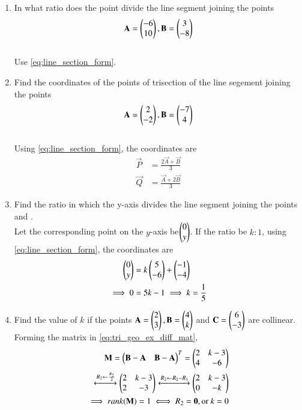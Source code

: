 \begin{enumerate}[label=\arabic*.,ref=\thesubsection.\theenumi]
\item In what ratio does the point  divide the line segment joining the points 
%
\begin{align}
\mathbf{A} = \begin{pmatrix}-6\\10\end{pmatrix},
\mathbf{B} = \begin{pmatrix}3\\-8\end{pmatrix}
\end{align}
%
\\
\solution Use \eqref{eq:line_section_form}.
\item Find the coordinates of the points of trisection of the line segement joining the points
%
\begin{align}
\mathbf{A} = \begin{pmatrix}2\\-2\end{pmatrix},
\mathbf{B} = \begin{pmatrix}-7\\4\end{pmatrix}
\end{align}
%
\\
\solution Using \eqref{eq:line_section_form}, the coordinates are
%
\begin{align}
\label{eq:line_section_form_tri}
\vec{P} &= \frac{2 \vec{A} + \vec{B}}{3}
\\
\vec{Q} &= \frac{ \vec{A} + 2\vec{B}}{3}
\end{align}
%

\item Find the ratio in which the y-axis divides the line segment joining the points  and .
\\
\solution Let the corresponding point on the $y$-axis be$\begin{pmatrix}0\\y\end{pmatrix}$. If the ratio be $k:1$,
using \eqref{eq:line_section_form}, the coordinates are
%
\begin{align}
\begin{pmatrix}0\\y\end{pmatrix} &= k\begin{pmatrix}5\\-6\end{pmatrix}+ \begin{pmatrix}-1\\-4\end{pmatrix}
\\
\implies 0 &= 5k-1 \implies k = \frac{1}{5}
\end{align}
%


\item Find the value of $k$ if the points $\mathbf{A}=\begin{pmatrix}2\\3\end{pmatrix}, \mathbf{B}=\begin{pmatrix}4\\k\end{pmatrix}$ and $\mathbf{C}=\begin{pmatrix}6\\-3\end{pmatrix}$ are collinear.
\\
\solution Forming the matrix in \eqref{eq:tri_geo_ex_diff_mat},
\begin{align}
\mathbf{M} = \begin{pmatrix}\mathbf{B}-\mathbf{A} & \mathbf{B}-\mathbf{A}\end{pmatrix}^T 
= \begin{pmatrix}2 & k-3\\4 & -6\end{pmatrix}&
\\
\xleftrightarrow {R_2\leftarrow \frac{R_2}{2}}\begin{pmatrix}2 & k-3\\2 & -3\end{pmatrix}
\xleftrightarrow {R_2\leftarrow R_2-R_1}\begin{pmatrix}2 & k-3\\0 & -k\end{pmatrix}&
\\
\implies rank(\mathbf{M})= 1 \iff R_2 = \mathbf{0}, \text{or }k = 0 &
\end{align}


\end{enumerate}
